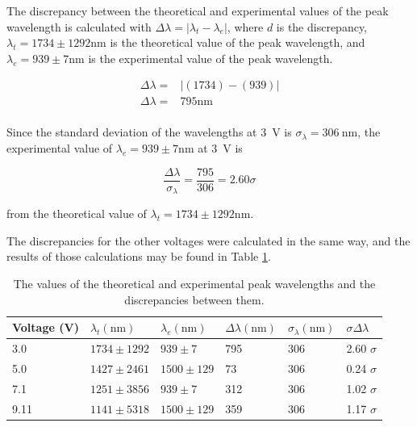 \documentclass[a4paper]{article}
\begin{document}
\qq The discrepancy between the theoretical and experimental values of the peak
wavelength is calculated with
\( \Delta \lambda = | \lambda_t - \lambda_e | \), where \( d \) is the
discrepancy, \( \lambda_t = 1734 \pm 1292 \si{\nano\meter} \) is the theoretical
value of the peak wavelength, and
\( \lambda_e = 939 \pm 7 \si{\nano\meter} \) is the experimental value of
the peak wavelength.

\begin{align*}
  \Delta \lambda =& \left| (1734) - (939) \right| \\
  \Delta \lambda =& 795 \si{\nano\meter} \\
\end{align*}

Since the standard deviation of the wavelengths at \SI{3}{\volt} is \(
\sigma_{\lambda} = \SI{306}{\nano\meter} \), the experimental value of \(
\lambda_e = 939 \pm 7 \si{\nano\meter} \) at \SI{3}{\volt} is

\begin{equation*}
  \frac{\Delta \lambda}{\sigma_{\lambda}} = \frac{795}{306} = 2.60 \sigma
\end{equation*}

from the theoretical value of \( \lambda_t = 1734 \pm 1292 \si{\nano\meter} \).

\qq The discrepancies for the other voltages were calculated in the same way,
and the results of those calculations may be found in Table
\ref{tab:peakWavelengths}.

\begin{table}[H]
  \caption{The values of the theoretical and experimental peak wavelengths and
    the discrepancies between them.}
  \label{tab:peakWavelengths}
  \begin{center}
    \begin{tabular}{|l|l|l|l|l|l|}
      \hline
      Voltage (\si{\volt}) & \( \lambda_t (\si{\nano\meter}) \) & 
      \( \lambda_e (\si{\nano\meter}) \) & 
      \( \Delta \lambda (\si{\nano\meter}) \) & 
      \( \sigma_{\lambda} (\si{\nano\meter}) \) &
      \( \sigma \Delta \lambda \) \\
      \hline
      3.0 & \( 1734 \pm 1292 \) & \( 939 \pm 7 \) & 795 & 306 & 2.60 \( \sigma
                                                                \) \\
      5.0 & \( 1427 \pm 2461 \) & \( 1500 \pm 129 \) & 73 & 306 & 0.24 \( \sigma
                                                                  \) \\
      7.1 & \( 1251 \pm 3856 \) & \( 939 \pm 7 \) & 312 & 306 & 1.02 \( \sigma
                                                                \) \\
      9.11 & \( 1141 \pm 5318 \) & \( 1500 \pm 129 \) & 359 & 306 & 1.17 \(
                                                                    \sigma \) \\
      \hline
    \end{tabular}
  \end{center}
\end{table}
\end{document}
